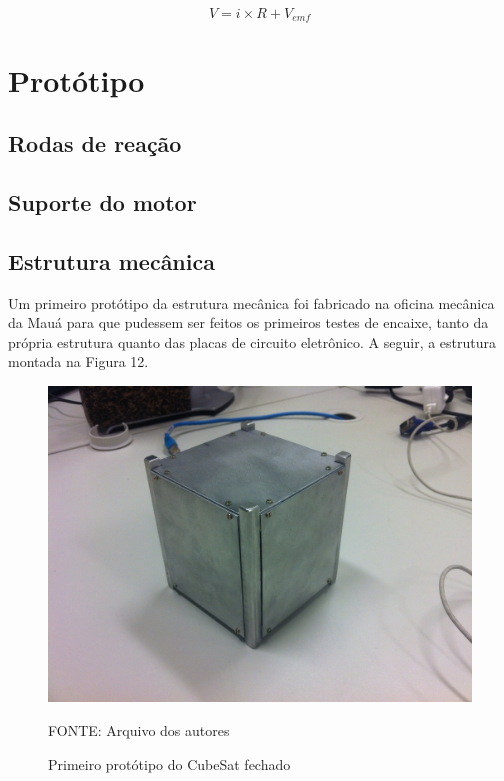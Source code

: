 \documentclass[
	12pt,				%
	openany,			%
	twoside,			%
	a4paper,			%
	english,			%
	french,				%
	spanish,			%
	brazil,				%
	oldfontcommands
	]{abntex2}
\begin{document}
\begin{equation}
V = i \times R + V_{emf}
\label{eq:Tens}
\end{equation}

\chapter[Protótipo]{Protótipo}



\section{Rodas de reação}



\section{Suporte do motor}



\section{Estrutura mecânica}

Um primeiro protótipo da estrutura mecânica foi fabricado na oficina mecânica da Mauá para que pudessem ser feitos os primeiros testes de encaixe, tanto da própria estrutura quanto das placas de circuito eletrônico. A seguir, a estrutura montada na Figura 12.

\begin{figure}[th]
	\caption{Primeiro protótipo do CubeSat fechado}
	\centering
	\includegraphics[width=0.7\linewidth]{./figs/PrototypeOne_Full}
	
	\begin{small}
		FONTE: Arquivo dos autores
	\end{small}
	\label{fig:ProtooneF}
\end{figure}
\end{document}
